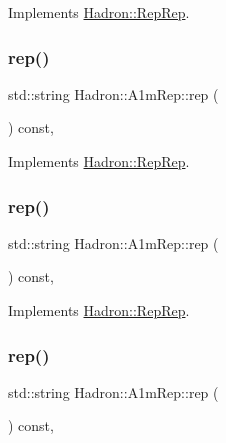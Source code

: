 Implements \mbox{\hyperlink{structHadron_1_1RepRep_ab3213025f6de249f7095892109575fde}{Hadron\+::\+Rep\+Rep}}.

\mbox{\label{structHadron_1_1A1mRep_a99e7f10bdf161f356d1061172d776f41}} 
\subsubsection{\texorpdfstring{rep()}{rep()}\hspace{0.1cm}{\footnotesize\ttfamily [3/5]}}
{\footnotesize\ttfamily std\+::string Hadron\+::\+A1m\+Rep\+::rep (\begin{DoxyParamCaption}{ }\end{DoxyParamCaption}) const\hspace{0.3cm}{\ttfamily [inline]}, {\ttfamily [virtual]}}



Implements \mbox{\hyperlink{structHadron_1_1RepRep_ab3213025f6de249f7095892109575fde}{Hadron\+::\+Rep\+Rep}}.

\mbox{\label{structHadron_1_1A1mRep_a99e7f10bdf161f356d1061172d776f41}} 
\subsubsection{\texorpdfstring{rep()}{rep()}\hspace{0.1cm}{\footnotesize\ttfamily [4/5]}}
{\footnotesize\ttfamily std\+::string Hadron\+::\+A1m\+Rep\+::rep (\begin{DoxyParamCaption}{ }\end{DoxyParamCaption}) const\hspace{0.3cm}{\ttfamily [inline]}, {\ttfamily [virtual]}}



Implements \mbox{\hyperlink{structHadron_1_1RepRep_ab3213025f6de249f7095892109575fde}{Hadron\+::\+Rep\+Rep}}.

\mbox{\label{structHadron_1_1A1mRep_a99e7f10bdf161f356d1061172d776f41}} 
\subsubsection{\texorpdfstring{rep()}{rep()}\hspace{0.1cm}{\footnotesize\ttfamily [5/5]}}
{\footnotesize\ttfamily std\+::string Hadron\+::\+A1m\+Rep\+::rep (\begin{DoxyParamCaption}{ }\end{DoxyParamCaption}) const\hspace{0.3cm}{\ttfamily [inline]}, {\ttfamily [virtual]}}



